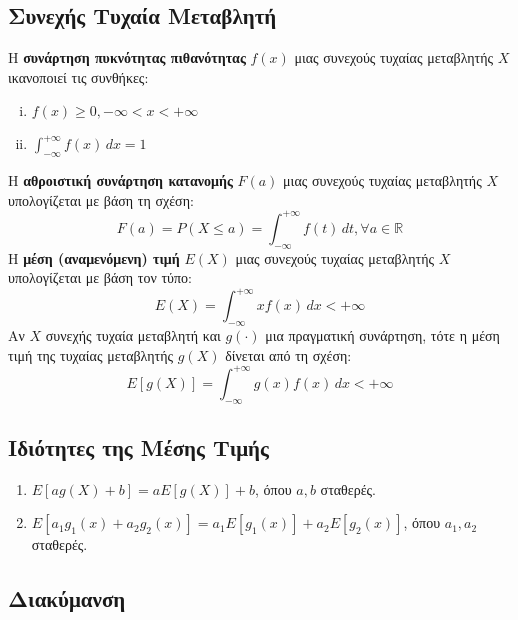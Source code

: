 \begin{minipage}[t]{.48\textwidth}
  \subsection*{Συνεχής Τυχαία Μεταβλητή}

  Η \textbf{συνάρτηση πυκνότητας πιθανότητας} $f(x)$ μιας συνεχούς τυχαίας μεταβλητής $X$ ικανοποιεί τις συνθήκες:
  \begin{enumerate}[i)]
    \item $f(x)\geq 0, -\infty<x<+\infty$
    \item $\int_{-\infty}^{+\infty}f(x)\,dx=1$
  \end{enumerate}
  Η \textbf{αθροιστική συνάρτηση κατανομής} $F(a)$ μιας συνεχούς τυχαίας
  μεταβλητής $X$ υπολογίζεται με βάση τη σχέση:
  \begin{equation*}
    F(a)=P(X\leq a)=\int_{-\infty}^{+\infty}f(t)\,dt, \forall a\in \mathbb{R}
  \end{equation*}
  Η \textbf{μέση (αναμενόμενη) τιμή} $E(X)$ μιας συνεχούς τυχαίας
  μεταβλητής $X$ υπολογίζεται με βάση τον τύπο:
  \begin{equation*}
    E(X)=\int_{-\infty}^{+\infty}xf(x)\,dx<+\infty
  \end{equation*}
  Αν $X$ συνεχής τυχαία μεταβλητή και $g(\cdot)$ μια πραγματική συνάρτηση, τότε
  η μέση τιμή της τυχαίας μεταβλητής $g(X)$ δίνεται από τη σχέση:
  \begin{equation*}
    E[g(X)]=\int_{-\infty}^{+\infty}g(x)f(x)\,dx<+\infty
  \end{equation*}
\end{minipage}

\subsection*{Ιδιότητες της Μέσης Τιμής}

\begin{enumerate}
  \item $E[ag(X)+b]=aE[g(X)]+b$, όπου $a,b$ σταθερές.
  \item $E[a_{1}g_{1}(x)+a_{2}g_{2}(x)]=a_{1}E[g_{1}(x)]+a_{2}E[g_{2}(x)]$,
  όπου $a_{1}, a_{2}$ σταθερές.
\end{enumerate}

 \subsection*{Διακύμανση}


